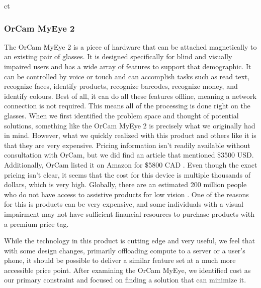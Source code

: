 ct\documentclass[a4paper,11pt]{article}
\begin{document}
\subsubsection{OrCam MyEye 2}
The OrCam MyEye 2 \cite{orcam} is a piece of hardware that can be attached magnetically to an existing pair of glasses. It is designed specifically for blind and visually impaired users and has a wide array of features to support that demographic. It can be controlled by voice or touch and can accomplish tasks such as read text, recognize faces, identify products, recognize barcodes, recognize money, and identify colours. Best of all, it can do all these features offline, meaning a network connection is not required. This means all of the processing is done right on the glasses. When we first identified the problem space and thought of potential solutions, something like the OrCam MyEye 2 is precisely what we originally had in mind. However, what we quickly realized with this product and others like it is that they are very expensive. Pricing information isn't readily available without consultation with OrCam, but we did find an article \cite{orcam-price} that mentioned \$3500 USD. Additionally, OrCam listed it on Amazon for \$5800 CAD \cite{orcam-amazon}. Even though the exact pricing isn't clear, it seems that the cost for this device is multiple thousands of dollars, which is very high. Globally, there are an estimated 200 million people who do not have access to assistive products for low vision \cite{WHO-assistive}. One of the reasons for this is products can be very expensive, and some individuals with a visual impairment may not have sufficient financial resources to purchase products with a premium price tag.

While the technology in this product is cutting edge and very useful, we feel that with some design changes, primarily offloading compute to a server or a user's phone, it should be possible to deliver a similar feature set at a much more accessible price point. After examining the OrCam MyEye, we identified cost as our primary constraint and focused on finding a solution that can minimize it.
\end{document}
